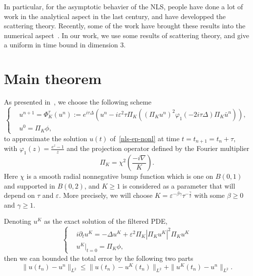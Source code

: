 \documentclass[10pt,a4paper]{article}
\begin{document}

  In particular, for the asymptotic behavier of the NLS, people have
  done a lot of work in the analytical aspect in the last century, and
  have developped the scattering theory. Recently,
  some of the work have brought these results into the numerical aspect~\cite{CS22}. In our
  work, we use some results of scattering theory, and give a uniform in time
  bound in dimension \(3\).

  \section{Main theorem}

  As presented in~\cite{ORS21}, we choose the following scheme
  \begin{equation}\label{num-sol} %
    \left\{
    \begin{aligned}
      & u^{n+1} = \Phi_K^{\tau}(u^n) := e^{i\tau\Delta} \left( u^n -
      i\varepsilon^2 \tau \Pi_K
      \left( {(\Pi_K u^n)}^2 \varphi_1(-2i\tau\Delta)\Pi_K \bar{u}^n \right) \right), \\
      & u^0 = \Pi_K \phi,
    \end{aligned}
    \right.
  \end{equation}
  to approximate the solution \(u(t)\) of~\eqref{nls-ep-nonl} at time \( t = t_{n+1} = t_n + \tau \),
  with \( \varphi_1(z) = \frac{e^z-1}{z} \) and the projection operator defined
  by the Fourier multiplier
  \begin{equation}
    \Pi_K = \chi^2 \left( \frac{-i\nabla}{K} \right).
  \end{equation}
  Here \(\chi\) is a smooth radial nonnegative bump function which is one on \(
  B(0,1) \) and supported in \( B(0,2) \), and \( K \geq 1 \) is considered as a
  parameter that will depend on \(\tau\) and \(\varepsilon\). More precisely, we will choose \( K =
  \varepsilon^{-\beta\gamma}\tau^{-\frac\gamma2} \) with some \(\beta \geq 0\) and 
  \(\gamma \geq 1\).  %

  Denoting \(u^K\) as the exact solution of the filtered PDE,
  \begin{equation}\label{nls-fil} %
    \left\{
    \begin{aligned}
      & i\partial_t u^K = -\Delta u^K + \varepsilon^2 \Pi_K|\Pi_K u^K|^2 \Pi_K u^K \\
      & u^K|_{t=0} = \Pi_K\phi,
    \end{aligned}
    \right.
  \end{equation}
  then we can bounded the total error by the following two parts
  \begin{equation}\label{seperr}
    \| u(t_n) - u^n \|_{L^2} \leq \| u(t_n) - u^K(t_n) \|_{L^2} + 
    \| u^K(t_n) - u^n \|_{L^2}.
  \end{equation}
\end{document}
